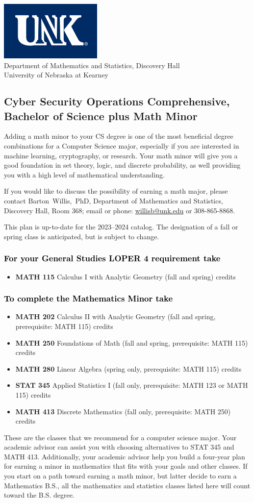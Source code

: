 \documentclass[11pt]{article}
\makeatletter
\newcommand{\calcone}{\textbf{MATH 115} Calculus I with Analytic Geometry (fall and spring) \dotfill 5 credits}
\newcommand{\calctwo}{\textbf{MATH 202} Calculus II with Analytic Geometry (fall and spring, prerequisite: MATH 115) \dotfill 5 credits }
\newcommand{\foundations}{\textbf{MATH 250} Foundations of Math (fall and spring, prerequisite: MATH 115)  \dotfill 3 credits}
\newcommand{\linear}{\textbf{MATH 280} Linear Algebra (spring only, prerequisite: MATH 115) \dotfill 3 credits}
\newcommand{\discrete}{\textbf{MATH 413} Discrete Mathematics  (fall only, prerequisite: MATH 250)\dotfill 3 credits}
\newcommand{\discreteshort}{MATH 413}
\newcommand{\appliedstat}{\textbf{STAT 345} Applied Statistics I (fall only, prerequisite: MATH 123 or MATH 115) \dotfill 3 credits}
\newcommand{\appliedstatshort}{STAT 345}
\newcommand{\contactbw}{\mbox{Barton Willis, PhD}, Department of Mathematics and Statistics,  Discovery Hall, Room 368;
email or phone: \href{mailto:willisb@unk.edu}{willisb@unk.edu} or 308-865-8868.}
\newcommand{\forinfo}[2]{If you would like to discuss the possibility of earning a math {#1}, please contact \contactbw}
\newcommand{\catalog}{2023--2024 }
\newcommand{\LOPER}{LOPER\xspace}
\newcommand{\uptodate}{This plan is up-to-date for  the \catalog catalog. The designation of a fall or spring class is 
anticipated, but  is subject to change.}
\newcommand{\myheading}{
\begin{flushleft}
\includegraphics[scale=0.35]{unk-logo}\\
\setcounter{footnote}{0}
\vspace{0.25in}
 \textcolor{unkblue}{Department of Mathematics and Statistics, Discovery Hall} \\
  \textcolor{unkblue}{University of Nebraska at Kearney}
\end{flushleft}}
\makeatother
\begin{document}
\vfill 
\newpage



\myheading

\subsection*{\textbf{\textcolor{unkblue}{Cyber Security Operations Comprehensive, Bachelor of Science plus Math Minor}}}

Adding a math minor to your CS degree is one of the most beneficial degree combinations 
for a Computer Science major, especially if you are interested in machine learning, 
cryptography,  or research.  Your math minor will give you a good foundation in 
set theory, logic, and discrete probability, as well providing you with a high level of 
mathematical understanding. 

 
 \forinfo{major}{Cyber Security Operations Comprehensive}

\uptodate
\vspace{-0.1in}

\subsubsection*{\textcolor{black}{For  your General Studies \LOPER 4 requirement take}}
\begin{itemize}
\item  \calcone
\end{itemize}

\subsubsection*{\textcolor{black}{To complete the Mathematics Minor take}}

\begin{itemize}
\item \calctwo
\item \foundations
\item \linear
\item \appliedstat
\item \discrete
\end{itemize}
\vspace{0.1in}
These are the classes that we recommend for a computer science major.
Your academic advisor can assist you with choosing alternatives 
to \appliedstatshort{} and \discreteshort{}. Additionally, your academic advisor help you build a four-year plan for earning 
a minor in mathematics that fits with your goals and other classes.  
If you start on a path toward earning a math minor, but latter decide to earn a  
Mathematics B.S., all the mathematics and statistics  
classes listed here will count toward the B.S. degree.
\end{document}
